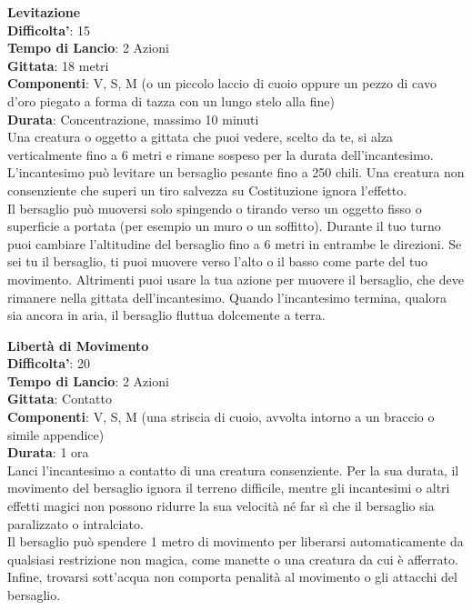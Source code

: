 \begin{multicols}{2}
\medskip\textbf{Levitazione}\\
\textbf{Difficolta'}: 15\\
\textbf{Tempo di Lancio}: 2 Azioni\\
\textbf{Gittata}: 18 metri\\
\textbf{Componenti}: V, S, M (o un piccolo laccio di cuoio oppure un pezzo di cavo d’oro piegato a forma di tazza con un lungo stelo alla fine)\\
\textbf{Durata}: Concentrazione, massimo 10 minuti \\
Una creatura o oggetto a gittata che puoi vedere, scelto da te, si alza verticalmente fino a 6 metri e rimane sospeso per la durata dell’incantesimo. L’incantesimo può levitare un bersaglio pesante fino a 250 chili. Una creatura non consenziente che superi un tiro salvezza su Costituzione ignora l’effetto.\\
Il bersaglio può muoversi solo spingendo o tirando verso un oggetto fisso o superficie a portata (per esempio un muro o un soffitto). Durante il tuo turno puoi cambiare l’altitudine del bersaglio fino a 6 metri in entrambe le direzioni. Se sei tu il bersaglio, ti puoi muovere verso l’alto o il basso come parte del tuo movimento. Altrimenti puoi usare la tua azione per muovere il bersaglio, che deve rimanere nella gittata dell’incantesimo. Quando l’incantesimo termina, qualora sia ancora in aria, il bersaglio fluttua dolcemente a terra. 

\medskip\textbf{Libertà di Movimento}\\
\textbf{Difficolta'}: 20\\
\textbf{Tempo di Lancio}: 2 Azioni\\
\textbf{Gittata}: Contatto\\
\textbf{Componenti}: V, S, M (una striscia di cuoio, avvolta intorno a un braccio o simile appendice)\\
\textbf{Durata}: 1 ora\\
Lanci l’incantesimo a contatto di una creatura consenziente. Per la sua durata, il movimento del bersaglio ignora il terreno difficile, mentre gli incantesimi o altri effetti magici non possono ridurre la sua velocità né far sì che il bersaglio sia paralizzato o intralciato.\\
Il bersaglio può spendere 1 metro di movimento per liberarsi automaticamente da qualsiasi restrizione non magica, come manette o una creatura da cui è afferrato. Infine, trovarsi sott’acqua non comporta penalità al movimento o gli attacchi del bersaglio. 


\end{multicols}
